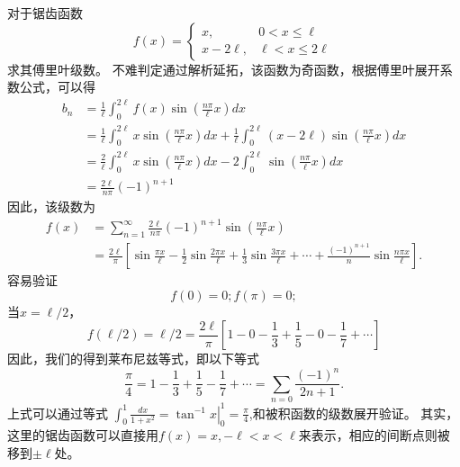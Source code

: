 \begin{examplebox}{
对于锯齿函数
\[  
f(x)= \begin{cases}
  x,   &  0 < x \leq  \ell 
  \\
  x - 2 \ell,   & \ell < x \leq 2\ell
\end{cases}
\]
求其傅里叶级数。
}
不难判定通过解析延拓，该函数为奇函数，根据傅里叶展开系数公式，可以得
\begin{align}
b_n &=   \frac{1}{\ell} \int_{0}^{2\ell} f(x) \sin {  \left( \frac{n\pi}{\ell} x \right) } dx \nonumber
\\
&= \frac{1}{\ell} \int_{0}^{2\ell} x  \sin {  \left( \frac{n\pi}{\ell} x \right) } dx \nonumber
  +
 \frac{1}{\ell} \int_{0}^{2\ell} (x - 2\ell) \sin {  \left( \frac{n\pi}{\ell} x \right) } dx \nonumber
 \\ 
 &= \frac{2}{\ell} \int_{0}^{2\ell} x \sin {  \left( \frac{n\pi}{\ell} x \right) } dx \nonumber
 -2 \int_{0}^{2\ell}   \sin {  \left( \frac{n\pi}{\ell} x \right) } dx \nonumber
 \\
 & = \frac{2\ell}{n\pi} (-1)^{n+1}  \nonumber
\end{align}
因此，该级数为
\begin{align}
f(x) &=  \sum_{n=1}^{\infty} \frac{2 \ell }{n\pi} (-1)^{n+1} \sin {  \left( \frac{n\pi}{\ell} x \right) }  \nonumber
\\
 & =\frac{2\ell}{\pi} \left[ \sin{\frac{\pi x}{\ell} } - \frac{1}{2}\sin{\frac{2\pi x}{\ell} } 
  +  \frac{1}{3}\sin{\frac{3\pi x}{\ell} } + \cdots + \frac{(-1)^{n+1}}{n}\sin{\frac{n\pi x}{\ell} }
 \right] \nonumber
.
\end{align}
容易验证
\[
  f(0) = 0; f(\pi) = 0;
\]
当$x=\ell/2$， 
\[
f(\ell/2) = \ell/2 =   \frac{2\ell}{\pi} \left[ 1 - 0 - \frac{1}{3} + \frac{1}{5} - 0 -\frac{1}{7}+ \cdots \right]
\]
因此，我们的得到莱布尼兹等式，即以下等式
\[
\frac{\pi}{4} = 1-\frac{1}{3} + \frac{1}{5} - \frac{1}{7} + \cdots = \sum_{n=0} \frac{(-1)^n}{2n + 1} .
\]
上式可以通过等式
$\int_0^1 \frac{d x}{1+x^2}=\left.\tan ^{-1} x\right|_0 ^1=\frac{\pi}{4}$,和被积函数的级数展开验证。
其实，这里的锯齿函数可以直接用$f(x) = x, -\ell < x < \ell$来表示，相应的间断点则被移到$\pm \ell$处。
\end{examplebox}


